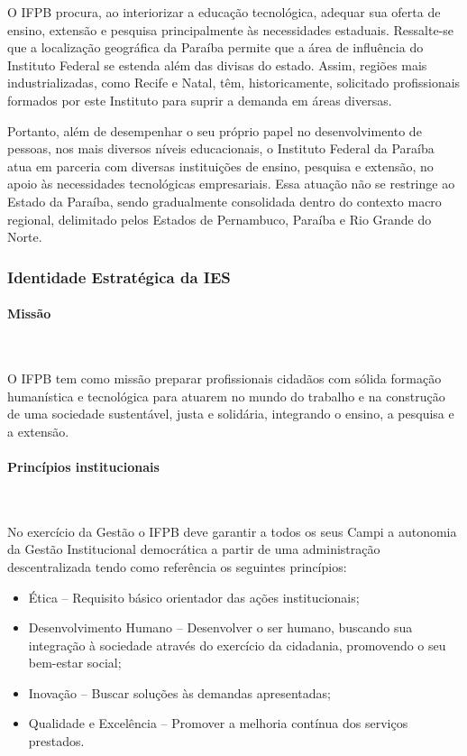 	O IFPB procura, ao interiorizar a educação tecnológica, adequar sua oferta de ensino, extensão e pesquisa principalmente às necessidades estaduais. Ressalte-se que a localização geográfica da Paraíba permite que a área de influência do Instituto Federal se estenda além das divisas do estado. Assim, regiões mais industrializadas, como Recife e Natal, têm, historicamente, solicitado profissionais formados por este Instituto para suprir a demanda em áreas diversas.

	Portanto, além de desempenhar o seu próprio papel no desenvolvimento de pessoas, nos mais diversos níveis educacionais, o Instituto Federal da Paraíba atua em parceria com diversas instituições de ensino, pesquisa e extensão, no apoio às necessidades tecnológicas empresariais. Essa atuação não se restringe ao Estado da Paraíba, sendo gradualmente consolidada dentro do contexto macro regional, delimitado pelos Estados de Pernambuco, Paraíba e Rio Grande do Norte.

\subsubsection{Identidade Estratégica da IES}

\paragraph{Missão}\

O IFPB tem como missão preparar profissionais cidadãos com sólida formação humanística e tecnológica para atuarem no mundo do trabalho e na construção de uma sociedade sustentável, justa e solidária, integrando o ensino, a pesquisa e a extensão.

\paragraph{Princípios institucionais}\

No exercício da Gestão o IFPB deve garantir a todos os seus Campi a autonomia da Gestão Institucional democrática a partir de uma administração descentralizada tendo como referência os seguintes princípios:

\begin{itemize}
  \item Ética – Requisito básico orientador das ações institucionais;
  \item Desenvolvimento Humano – Desenvolver o ser humano, buscando sua integração à sociedade através do exercício da cidadania, promovendo o seu bem-estar social;
  \item Inovação – Buscar soluções às demandas apresentadas;
  \item Qualidade e Excelência – Promover a melhoria contínua dos serviços prestados.
\end{itemize}

